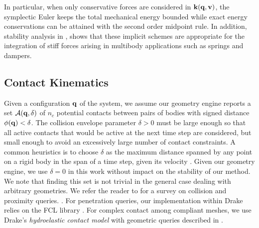 In particular, when only conservative forces are considered in
${\mathbf{k}}({\mathbf{q}},{\mathbf{v}})$, the symplectic Euler keeps the total mechanical energy
bounded while exact energy conservations can be attained with the second order
midpoint rule. In addition, stability analysis in
\cite{bib:anitescu2002,bib:potra2006linearly}, shows that these implicit schemes
are appropriate for the integration of stiff forces arising in multibody
applications such as springs and dampers.

\subsection{Contact Kinematics}
\label{sec:contact_modeling}

Given a configuration ${\mathbf{q}}$ of the system, we assume our geometry engine
reports a set $\mathcal{A}({\mathbf{q}},\delta)$ of $n_c$ potential contacts between
pairs of bodies with signed distance $\phi({\mathbf{q}}) < \delta$. The collision
envelope parameter $\delta > 0$ must be large enough so that all active contacts
that would be active at the next time step are considered, but small enough to
avoid an excessively large number of contact constraints. A common heuristics is
to choose $\delta$ as the maximum distance spanned by any point on a rigid body
in the span of a time step, given its velocity \cite{bib:anitescu2010}. Given
our geometry engine, we use $\delta = 0$ in this work without impact on the
stability of our method. We note that finding this set is not trivial in the
general case dealing with arbitrary geometries. We refer the reader to
\cite{bib:hadap2004collision,bib:lin2017collision, bib:erleben2018methodology,
bib:flores2021contact} for a survey on collision and proximity queries.
. For penetration queries, our implementation
within Drake \cite{bib:drake} relies on the FCL library \cite{bib:fcl}. For
complex contact among compliant meshes, we use Drake's \emph{hydroelastic
contact model} with geometric queries described in \cite{bib:elandt2019pressure,
bib:masterjohn2021discrete}.

